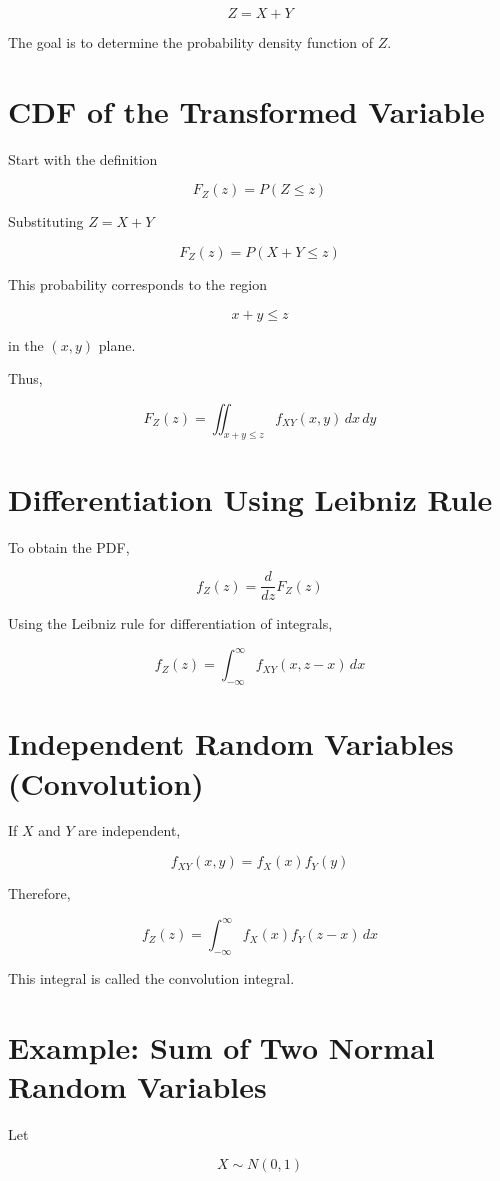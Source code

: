 \documentclass[11pt]{article}
\begin{document}
\[
Z = X + Y
\]

The goal is to determine the probability density function of $Z$.

\section{CDF of the Transformed Variable}

Start with the definition

\[
F_Z(z) = P(Z \le z)
\]

Substituting $Z = X + Y$

\[
F_Z(z) = P(X + Y \le z)
\]

This probability corresponds to the region

\[
x + y \le z
\]

in the $(x,y)$ plane.

Thus,

\[
F_Z(z) =
\iint_{x+y\le z} f_{XY}(x,y)\,dx\,dy
\]

\section{Differentiation Using Leibniz Rule}

To obtain the PDF,

\[
f_Z(z) = \frac{d}{dz}F_Z(z)
\]

Using the Leibniz rule for differentiation of integrals,

\[
f_Z(z) =
\int_{-\infty}^{\infty}
f_{XY}(x,z-x)\,dx
\]

\section{Independent Random Variables (Convolution)}

If $X$ and $Y$ are independent,

\[
f_{XY}(x,y) = f_X(x)f_Y(y)
\]

Therefore,

\[
f_Z(z) =
\int_{-\infty}^{\infty}
f_X(x)f_Y(z-x)\,dx
\]

This integral is called the convolution integral.

\section{Example: Sum of Two Normal Random Variables}

Let

\[
X \sim N(0,1)
\]
\end{document}
